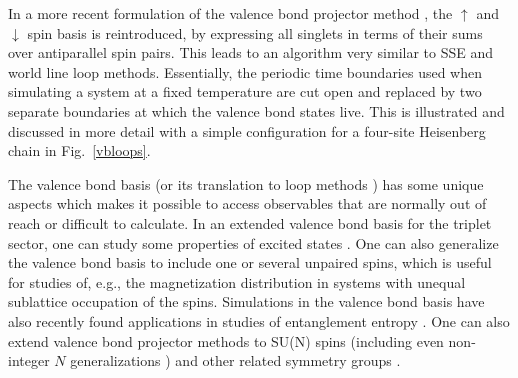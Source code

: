 \documentclass[draft,numberedheadings]{aipproc}
\newcommand{\dn}{\downarrow}
\newcommand{\up}{\uparrow}
\begin{document}
In a more recent formulation of the valence bond projector method \cite{awshg}, the $\up$ and $\dn$ spin basis is reintroduced, by expressing all singlets 
in terms of their sums over antiparallel spin pairs. This leads to an algorithm very similar to SSE and world line loop methods. Essentially, the periodic
time boundaries used when simulating a system at a fixed temperature are cut open and replaced by two separate boundaries at which the valence bond states 
live. This is illustrated and discussed in more detail with a simple configuration for a four-site Heisenberg chain in Fig.~\ref{vbloops}.

The valence bond basis (or its translation to loop methods \cite{nachtergale,awshg})  has some unique aspects which makes it possible to access observables that are 
normally out of reach or difficult to calculate. In an extended valence bond basis for the triplet sector, one can study some properties of excited states 
\cite{vbmethod1,vbmethod2,wangperc}. One can also generalize the valence bond basis to include one \cite{banerjee10b} or several \cite{wangperc} 
unpaired spins, which is useful for studies of, e.g., the magnetization distribution in systems with unequal sublattice occupation of the spins. 
Simulations in the valence bond basis have also recently found applications in studies of entanglement entropy 
\cite{hastings1,alet07,chhajlany07,tran09,kallin09}. One can also extend valence bond projector methods to SU(N) spins \cite{lou1} (including
even non-integer $N$ generalizations \cite{beach09}) and other related symmetry groups \cite{tran09}.
\end{document}

